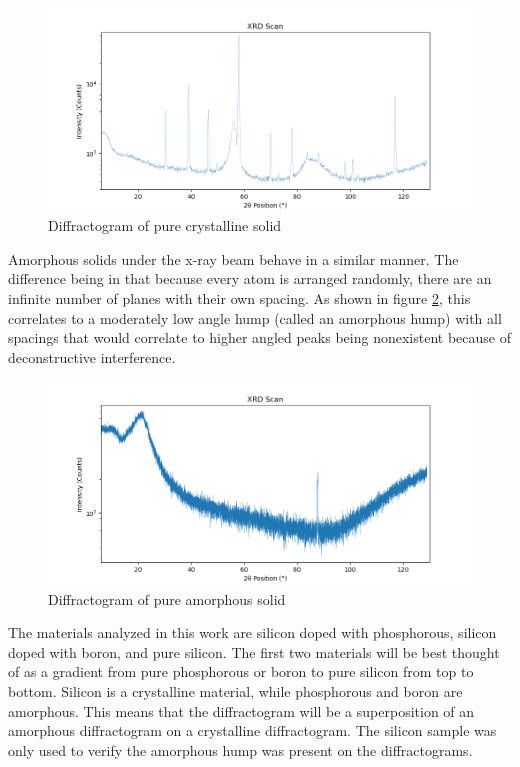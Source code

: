 \documentclass{article}
\begin{document}
\begin{figure}[H]
    \centering
    \includegraphics[width=1\linewidth]{crystalline XRD scan.png}
    \caption{Diffractogram of pure crystalline solid}
    \label{fig:pure crystalline XRD scan}
\end{figure}

    Amorphous solids under the x-ray beam behave in a similar manner. The difference being in that because every atom is arranged randomly, there are an infinite number of planes with their own spacing. As shown in figure \ref{fig:pure amorphous XRD scan}, this correlates to a moderately low angle hump (called an amorphous hump) with all spacings that would correlate to higher angled peaks being nonexistent because of deconstructive interference.

\begin{figure}[H]
    \centering
    \includegraphics[width=1\linewidth]{amorphous XRD scan.png}
    \caption{Diffractogram of pure amorphous solid}
    \label{fig:pure amorphous XRD scan}
\end{figure}

    The materials analyzed in this work are silicon doped with phosphorous, silicon doped with boron, and pure silicon. The first two materials will be best thought of as a gradient from pure phosphorous or boron to pure silicon from top to bottom. Silicon is a crystalline material, while phosphorous and boron are amorphous. This means that the diffractogram will be a superposition of an amorphous diffractogram on a crystalline diffractogram. The silicon sample was only used to verify the amorphous hump was present on the diffractograms.
\end{document}
